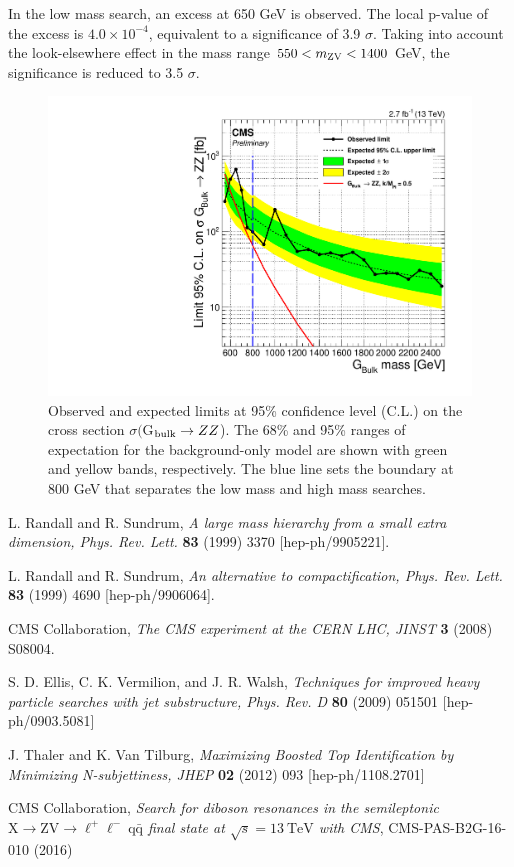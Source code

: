 \documentclass{PoS}
\begin{document}
In the low mass search, an excess at 650 GeV is observed. The local p-value of the excess is $4.0\times 10^{-4}$, equivalent to a significance of 3.9 $\sigma$. Taking into account the look-elsewhere effect in the mass range $550 < m_{\rm ZV} < 1400$ GeV, the significance is reduced to 3.5 $\sigma$.

\begin{figure}[htb]
\begin{center}
\includegraphics[width=0.45\linewidth]{combinedLimit.pdf}
\caption{
Observed and expected limits at 95\% confidence level (C.L.) on the cross section $\sigma($G$_{\rm bulk}\rightarrow ZZ$). The 68\% and 95\% ranges of expectation for the background-only model are shown with green and yellow bands, respectively. The blue line sets the boundary at 800 GeV that separates the low mass and high mass searches.
}
\label{fig:limit}
\end{center}
\end{figure}

\begin{thebibliography}{99}

 L. Randall and R. Sundrum, \emph{A large mass hierarchy from a small extra dimension, Phys. Rev. Lett.} {\bf 83} (1999) 3370 [hep-ph/9905221]. 

 L. Randall and R. Sundrum, \emph{An alternative to compactification, Phys. Rev. Lett.} {\bf 83} (1999) 4690 [hep-ph/9906064]. 


 CMS Collaboration, \emph{The CMS experiment at the CERN LHC, JINST} {\bf 3} (2008) S08004.

 S. D. Ellis, C. K. Vermilion, and J. R. Walsh, \emph{Techniques for improved heavy particle searches with jet substructure, Phys. Rev.  D} {\bf 80} (2009) 051501 [hep-ph/0903.5081]

 J. Thaler and K. Van Tilburg, \emph{Maximizing Boosted Top Identification by Minimizing N-subjettiness, JHEP} {\bf 02} (2012) 093 [hep-ph/1108.2701]

CMS Collaboration, \emph{Search for diboson resonances in the semileptonic $\mathrm{X}\rightarrow\mathrm{Z}\mathrm{V}\rightarrow\ell^+\ell^-~\mathrm{q\bar{q}}$ final state at $\sqrt{s} = 13~\mathrm{TeV}$ with CMS}, CMS-PAS-B2G-16-010 (2016)




\end{thebibliography}
\end{document}
